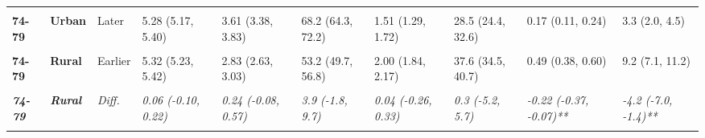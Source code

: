 \begin{table}[!h]
{{\begin{tabular}[t]{>{}l>{}lllllllll}
\cmidrule{1-10}
\textbf{\cellcolor{gray!10}{74-79}} & \textbf{\cellcolor{gray!10}{Urban}} & \cellcolor{gray!10}{Earlier} & \cellcolor{gray!10}{5.22 (5.09, 5.35)} & \cellcolor{gray!10}{3.11 (2.89, 3.33)} & \cellcolor{gray!10}{59.5 (55.5, 63.5)} & \cellcolor{gray!10}{1.79 (1.58, 2.01)} & \cellcolor{gray!10}{34.4 (30.3, 38.4)} & \cellcolor{gray!10}{0.32 (0.21, 0.43)} & \cellcolor{gray!10}{6.1 (4.0, 8.2)}\\
\cmidrule{1-10}
\textbf{74-79} & \textbf{Urban} & Later & 5.28 (5.17, 5.40) & 3.61 (3.38, 3.83) & 68.2 (64.3, 72.2) & 1.51 (1.29, 1.72) & 28.5 (24.4, 32.6) & 0.17 (0.11, 0.24) & 3.3 (2.0, 4.5)\\
\cmidrule{1-10}
\em{\textbf{\cellcolor{gray!10}{74-79}}} & \em{\textbf{\cellcolor{gray!10}{Urban}}} & \em{\cellcolor{gray!10}{Diff.}} & \em{\cellcolor{gray!10}{0.06 (-0.11, 0.24)}} & \em{\cellcolor{gray!10}{0.50 (0.18, 0.81)**}} & \em{\cellcolor{gray!10}{8.7 (3.1, 14.3)**}} & \em{\cellcolor{gray!10}{-0.29 (-0.59, 0.02)}} & \em{\cellcolor{gray!10}{-5.9 (-11.6, -0.1)*}} & \em{\cellcolor{gray!10}{-0.15 (-0.28, -0.02)*}} & \em{\cellcolor{gray!10}{-2.8 (-5.3, -0.4)*}}\\
\cmidrule{1-10}
\textbf{74-79} & \textbf{Rural} & Earlier & 5.32 (5.23, 5.42) & 2.83 (2.63, 3.03) & 53.2 (49.7, 56.8) & 2.00 (1.84, 2.17) & 37.6 (34.5, 40.7) & 0.49 (0.38, 0.60) & 9.2 (7.1, 11.2)\\
\cmidrule{1-10}
\textbf{\cellcolor{gray!10}{74-79}} & \textbf{\cellcolor{gray!10}{Rural}} & \cellcolor{gray!10}{Later} & \cellcolor{gray!10}{5.38 (5.25, 5.51)} & \cellcolor{gray!10}{3.08 (2.82, 3.33)} & \cellcolor{gray!10}{57.2 (52.6, 61.7)} & \cellcolor{gray!10}{2.04 (1.79, 2.29)} & \cellcolor{gray!10}{37.9 (33.4, 42.4)} & \cellcolor{gray!10}{0.27 (0.17, 0.37)} & \cellcolor{gray!10}{5.0 (3.1, 6.8)}\\
\cmidrule{1-10}
\em{\textbf{74-79}} & \em{\textbf{Rural}} & \em{Diff.} & \em{0.06 (-0.10, 0.22)} & \em{0.24 (-0.08, 0.57)} & \em{3.9 (-1.8, 9.7)} & \em{0.04 (-0.26, 0.33)} & \em{0.3 (-5.2, 5.7)} & \em{-0.22 (-0.37, -0.07)**} & \em{-4.2 (-7.0, -1.4)**}\\
\cmidrule{1-10}
\textbf{\cellcolor{gray!10}{80-85}} & \textbf{\cellcolor{gray!10}{Urban}} & \cellcolor{gray!10}{Earlier} & \cellcolor{gray!10}{4.86 (4.73, 5.00)} & \cellcolor{gray!10}{2.86 (2.63, 3.10)} & \cellcolor{gray!10}{58.9 (54.3, 63.5)} & \cellcolor{gray!10}{1.53 (1.29, 1.78)} & \cellcolor{gray!10}{31.5 (26.5, 36.6)} & \cellcolor{gray!10}{0.47 (0.31, 0.62)} & \cellcolor{gray!10}{9.6 (6.5, 12.7)}\\

\end{tabular}}}
\end{table}
